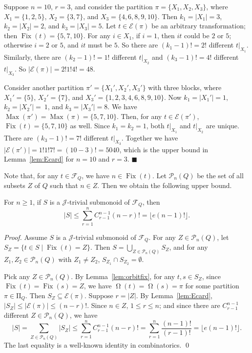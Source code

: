 \documentclass{llncs}
\renewcommand{\le}{\leqslant}
\renewcommand{\ge}{\geqslant}
\newcommand{\cE}{{\mathcal E}}
\newcommand{\cF}{{\mathcal F}}
\newcommand{\cP}{{\mathcal P}}
\newcommand{\gJ}{{\mathcal J}}
\newcommand{\rmPi}{{\mathrm \Pi}}
\newcommand{\qedb}{\hfill$\blacksquare$}
\DeclareMathOperator{\Fix}{Fix}
\DeclareMathOperator{\Orbit}{\Omega}
\DeclareMathOperator{\Max}{Max}
\begin{document}
\begin{example}\label{ex:Ecard}
Suppose $n = 10$, $r = 3$, and consider the partition $\pi = \{X_1, X_2, X_3\}$, where $X_1 = \{1,2,5\}$, $X_2 = \{3,7\}$, and $X_3 = \{4,6,8,9,10\}$. Then $k_1 = |X_1| = 3$, $k_2 = |X_2| = 2$, and $k_3 = |X_3| = 5$. Let $t \in \cE(\pi)$ be an arbitrary transformation; then $\Fix(t) = \{5,7,10\}$. For any $i \in X_1$, if $i = 1$, then $it$ could be $2$ or $5$; otherwise $i = 2$ or $5$, and $it$ must be $5$. So there are $(k_1-1)! = 2!$ different $t|_{X_1}$. Similarly, there are $(k_2-1)! = 1!$ different $t|_{X_2}$ and $(k_3-1)! = 4!$ different $t|_{X_3}$. So $|\cE(\pi)| = 2!1!4! = 48$. 

Consider another partition $\pi' = \{X_1', X_2', X_3'\}$ with three blocks, where $X_1' = \{5\}$, $X_2' = \{7\}$, and $X_3' = \{1,2,3,4,6,8,9,10\}$. Now $k_1 = |X_1'| = 1$, $k_2 = |X_2'| =~1$, and $k_3 = |X_3'| = 8$. We have $\Max(\pi') = \Max(\pi) = \{5,7,10\}$. Then, for any $t \in \cE(\pi')$, $\Fix(t) = \{5,7,10\}$ as well. Since $k_1 = k_2 = 1$, both $t|_{X_1}$ and $t|_{X_2}$ are unique. There are $(k_3-1)! = 7!$ different $t|_{X_3}$. Together we have $|\cE(\pi')| = 1!1!7! = (10-3)! = 5040$, which is the upper bound in Lemma~\ref{lem:Ecard} for $n = 10$ and $r = 3$. \qedb
\end{example}

Note that, for any $t \in \cF_Q$, we have $n \in \Fix(t)$. Let $\cP_n(Q)$ be the set of all subsets $Z$ of $Q$ such that $n \in Z$. Then we obtain the following upper bound. 

\begin{proposition}\label{prop:Jbound} 
For $n \ge 1$, if $S$ is a $\gJ$-trivial submonoid of $\cF_Q$, then $$|S| \le \sum_{r=1}^n C^{n-1}_{r-1} (n-r)! = \lfloor e(n-1)! \rfloor.$$ 
\end{proposition}


\begin{proof} 
Assume $S$ is a $\gJ$-trivial submonoid of $\cF_Q$. For any $Z \in \cP_n(Q)$, let $S_Z = \{t \in S \mid \Fix(t) = Z\}$. Then $S = \bigcup_{Z \in \cP_n(Q)} S_Z$, and for any $Z_1, Z_2 \in \cP_n(Q)$ with $Z_1 \neq Z_2$, $S_{Z_1} \cap S_{Z_2} = \emptyset$. 


Pick any $Z \in \cP_n(Q)$. By Lemma~\ref{lem:orbitfix}, for any $t, s \in S_Z$, since $\Fix(t) = \Fix(s) = Z$, we have $\Orbit(t) = \Orbit(s) = \pi$ for some partition $\pi \in \rmPi_Q$. Then $S_Z \subseteq \cE(\pi)$. Suppose $r = |Z|$. By Lemma~\ref{lem:Ecard}, $|S_Z| \le |\cE(\pi)| \le (n-r)!$. Since $n \in Z$, $1 \le r \le n$; and since there are $C^{n-1}_{r-1}$ different $Z \in \cP_n(Q)$, we have 
 $$|S| = \sum_{Z \in \cP_n(Q)}|S_Z|  \le \sum_{r=1}^n C^{n-1}_{r-1} (n-r)! 
                              =  \sum_{r=1}^n \frac{(n-1)!}{(r-1)!}
                             =  \lfloor e(n-1)! \rfloor. $$
The last equality is a well-known  identity in combinatorics. \qed
\end{proof}
\end{document}
